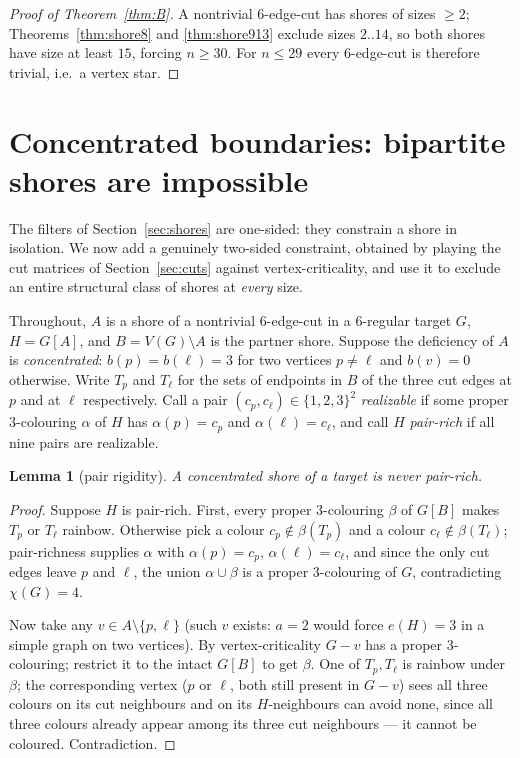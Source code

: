 \documentclass[11pt]{article}
\newtheorem{lemma}[theorem]{Lemma}
\theoremstyle{remark}
\begin{document}
\begin{proof}[Proof of Theorem~\ref{thm:B}]
A nontrivial $6$-edge-cut has shores of sizes $\ge 2$; Theorems~\ref{thm:shore8}
and \ref{thm:shore913} exclude sizes $2..14$, so both shores have size at least
$15$, forcing $n\ge 30$. For $n\le 29$ every $6$-edge-cut is therefore trivial,
i.e.\ a vertex star.
\end{proof}

\section{Concentrated boundaries: bipartite shores are impossible}
\label{sec:bipartite}

The filters of Section~\ref{sec:shores} are one-sided: they constrain a shore in
isolation. We now add a genuinely two-sided constraint, obtained by playing the
cut matrices of Section~\ref{sec:cuts} against vertex-criticality, and use it to
exclude an entire structural class of shores at \emph{every} size.

Throughout, $A$ is a shore of a nontrivial $6$-edge-cut in a $6$-regular target
$G$, $H=G[A]$, and $B=V(G)\setminus A$ is the partner shore. Suppose the
deficiency of $A$ is \emph{concentrated}: $b(p)=b(\ell)=3$ for two vertices
$p\ne\ell$ and $b(v)=0$ otherwise. Write $T_p$ and $T_\ell$ for the sets of
endpoints in $B$ of the three cut edges at $p$ and at $\ell$ respectively. Call a
pair $(c_p,c_\ell)\in\{1,2,3\}^2$ \emph{realizable} if some proper $3$-colouring
$\alpha$ of $H$ has $\alpha(p)=c_p$ and $\alpha(\ell)=c_\ell$, and call $H$
\emph{pair-rich} if all nine pairs are realizable.

\begin{lemma}[pair rigidity]\label{lem:pairrigid}
A concentrated shore of a target is never pair-rich.
\end{lemma}

\begin{proof}
Suppose $H$ is pair-rich. First, every proper $3$-colouring $\beta$ of $G[B]$
makes $T_p$ or $T_\ell$ rainbow. Otherwise pick a colour
$c_p\notin\beta(T_p)$ and a colour $c_\ell\notin\beta(T_\ell)$; pair-richness
supplies $\alpha$ with $\alpha(p)=c_p$, $\alpha(\ell)=c_\ell$, and since the only
cut edges leave $p$ and $\ell$, the union $\alpha\cup\beta$ is a proper
$3$-colouring of $G$, contradicting $\chi(G)=4$.

Now take any $v\in A\setminus\{p,\ell\}$ (such $v$ exists: $a=2$ would force
$e(H)=3$ in a simple graph on two vertices). By vertex-criticality $G-v$ has a
proper $3$-colouring; restrict it to the intact $G[B]$ to get $\beta$. One of
$T_p,T_\ell$ is rainbow under $\beta$; the corresponding vertex ($p$ or $\ell$,
both still present in $G-v$) sees all three colours on its cut neighbours and on
its $H$-neighbours can avoid none, since all three colours already appear among
its three cut neighbours --- it cannot be coloured. Contradiction.
\end{proof}
\end{document}

